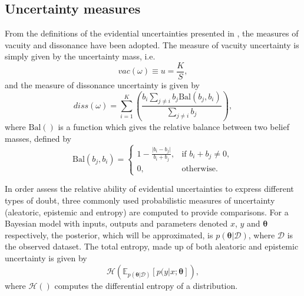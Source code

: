 \documentclass[
twocolumn,
]{ceurart}
\begin{document}
\subsection{Uncertainty measures}
\label{sec::UncertaintyMeasures}
From the definitions of the evidential uncertainties presented in \cite{Josang2018}, the measures of vacuity and dissonance have been adopted.
The measure of vacuity uncertainty is simply given by the uncertainty mass, i.e.
\begin{equation}
    vac(\omega)\equiv u = \frac{K}{S},
\label{eq::vacuity}
\end{equation}
and the measure of dissonance uncertainty is given by
\begin{equation}
    diss(\omega)=\sum_{i=1}^K\left(\frac{b_i\sum_{j\neq i}b_j\textrm{Bal}(b_j,b_i)}{\sum_{j\neq i}b_j}\right),
\end{equation}
where $\textrm{Bal}()$ is a function which gives the relative balance between two belief masses, defined by
\begin{equation}
    \textrm{Bal}(b_j,b_i)=\begin{cases}1-\frac{\vert b_i-b_j\vert}{b_i+b_j},&\text{if } b_i+b_j\neq0,\\
    0,&\text{otherwise.}\end{cases}
\end{equation}

In order assess the relative ability of evidential uncertainties to express different types of doubt, three commonly used probabilistic measures of uncertainty (aleatoric, epistemic and entropy) are computed to provide comparisons.
For a Bayesian model with inputs, outputs and parameters denoted $x$, $y$ and $\boldsymbol{\theta}$ respectively, the posterior, which will be approximated, is $p(\boldsymbol{\theta}\vert\mathcal{D})$, where $\mathcal{D}$ is the observed dataset.
The total entropy, made up of both aleatoric and epistemic uncertainty \cite{Depeweg2018} is given by
\begin{equation}
    \mathcal{H}\left(\mathbb{E}_{p(\boldsymbol{\theta}\vert \mathcal{D})}\left[p(y\vert x;\boldsymbol{\theta}\right]\right),
\end{equation}
where $\mathcal{H}()$ computes the differential entropy of a distribution.
\end{document}
